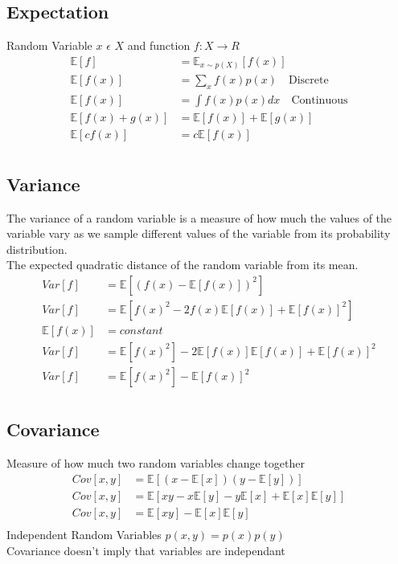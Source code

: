 \documentclass{article}
\begin{document}
\subsection{Expectation}
Random Variable $x$ $\epsilon$ $X$ and function $ f : X \rightarrow R $
\begin{align*}
    \mathbb{E}[f]           & = \mathbb{E}_{x \sim p(X)}[f(x)]          \\
    \mathbb{E}[f(x)]        & = \sum_{x} f(x)p(x) \quad \text{Discrete} \\
    \mathbb{E}[f(x)]        & = \int f(x)p(x)dx \quad \text{Continuous} \\
    \mathbb{E}[f(x) + g(x)] & = \mathbb{E}[f(x)] + \mathbb{E}[g(x)]     \\
    \mathbb{E}[cf(x)]       & = c\mathbb{E}[f(x)]                       \\
\end{align*}

\subsection{Variance}
The variance of a random variable is a measure of how much the values of the variable vary as we sample different values of the variable from its probability distribution. \\
The expected quadratic distance of the random variable from its mean.
\begin{align*}
    Var[f]           & = \mathbb{E}[(f(x) - \mathbb{E}[f(x)])^2]                                     \\
    Var[f]           & = \mathbb{E}[f(x)^2 - 2f(x)\mathbb{E}[f(x)] + \mathbb{E}[f(x)]^2 ]            \\
    \mathbb{E}[f(x)] & = constant                                                                    \\
    Var[f]           & = \mathbb{E}[f(x)^2] - 2\mathbb{E}[f(x)]\mathbb{E}[f(x)] + \mathbb{E}[f(x)]^2 \\
    Var[f]           & = \mathbb{E}[f(x)^2] - \mathbb{E}[f(x)]^2                                     \\
\end{align*}

\subsection{Covariance}
Measure of how much two random variables change together
\begin{align}
    Cov[x,y] & = \mathbb{E}[(x - \mathbb{E}[x])(y - \mathbb{E}[y])]                          \\
    Cov[x,y] & = \mathbb{E}[xy -x\mathbb{E}[y] -y\mathbb{E}[x] + \mathbb{E}[x]\mathbb{E}[y]] \\
    Cov[x,y] & = \mathbb{E}[xy] - \mathbb{E}[x]\mathbb{E}[y]                                 \\
\end{align}
Independent Random Variables $p(x,y)=p(x)p(y)$ \\
Covariance doesn't imply that variables are independant
\end{document}
